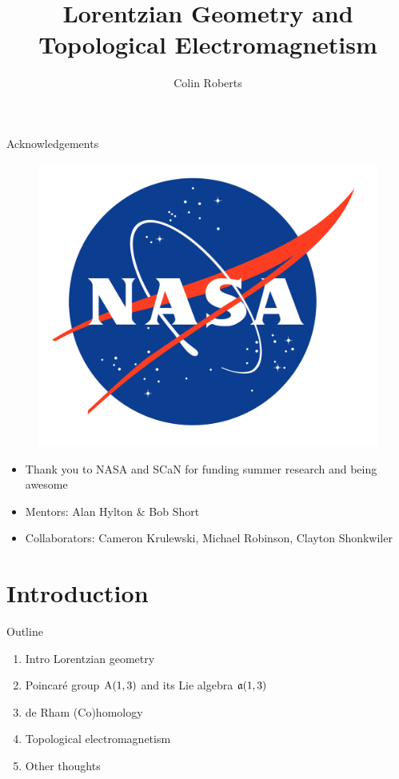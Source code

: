\documentclass[aspectratio=169]{beamer}
\title{Lorentzian Geometry and Topological Electromagnetism}
\author{Colin Roberts}
\begin{document}

\begin{frame}{Acknowledgements}
\vfill
    \begin{figure}[h]
    \includegraphics[scale=.05]{figures/NASA_logo.png}
    \end{figure}
\begin{itemize}
	\item Thank you to NASA and SCaN for funding summer research and being awesome
	\item Mentors: Alan Hylton \& Bob Short
	\item Collaborators: Cameron Krulewski, Michael Robinson, Clayton Shonkwiler
\end{itemize}
\vfill
\end{frame}


\section{Introduction}



\begin{frame}{Outline}
\vfill
\begin{enumerate}
    \item Intro Lorentzian geometry
    \item Poincar\'e group $\mathrm{A}(1,3)$ and its Lie algebra $\mathfrak{a}(1,3)$
    \item de Rham (Co)homology
    \item Topological electromagnetism
    \item Other thoughts
\end{enumerate}
\vfill
\end{frame}
\end{document}
